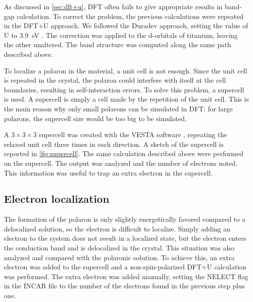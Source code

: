 As discussed in \cref{sec:dft+u}, DFT often fails to give appropriate results in band-gap calculation. To correct the problem, the previous calculations were repeated in the DFT+U approach. We followed the Duradev approach, setting the value of U to \SI{3.9}{eV} \cite{reticcioli2022}. The correction was applied to the d-orbitals of titanium, leaving the other unaltered. The band structure was computed along the same path described above.

To localize a polaron in the material, a unit cell is not enough. Since the unit cell is repeated in the crystal, the polaron could interfere with itself at the cell boundaries, resulting in self-interaction errors. To solve this problem, a supercell is used. A supercell is simply a cell made by the repetition of the unit cell. This is the main reason why only small polarons can be simulated in DFT: for large polarons, the supercell size would be too big to be simulated.

A $3\times3\times3$ supercell was created with the VESTA software \cite{zotero-174}, repeating the relaxed unit cell three times in each direction. A sketch of the supercell is reported in \cref{fig:supercell}. The same calculation described above were performed on the supercell. The output was analyzed and the number of electrons noted. This information was useful to trap an extra electron in the supercell.

\subsection{Electron localization}
The formation of the polaron is only slightly energetically favored compared to a delocalized solution, so the electron is difficult to localize. Simply adding an electron to the system does not result in a localized state, but the electron enters the conduction band and is delocalized in the crystal. This situation was also analyzed and compared with the polaronic solution. To achieve this, an extra electron was added to the supercell and a non-spin-polarized DFT+U calculation was performed. The extra electron was added manually, setting the NELECT flag in the INCAR file to the number of the electrons found in the previous step plus one.

